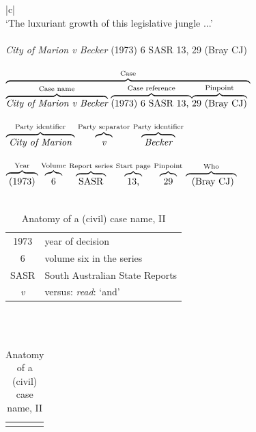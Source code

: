  \newpage

\begin{table}
\begin{center}
\begin{tabular}{|c|}
\hline \\
`The luxuriant growth of this legislative jungle ...'
\\ \\%
\textit{City of Marion v Becker} (1973) 6 SASR 13, 29 (Bray CJ)
\\ \\%
$%
\stackrel{\textrm{Case}}{%
\overbrace{%
\stackrel{\textrm{Case name}}{\overbrace{\textit{City of Marion v Becker}}}\ 
\stackrel{\textrm{Case reference}}{\overbrace{\textrm{(1973) 6 SASR 13, }}}
\stackrel{\textrm{Pinpoint}}{\overbrace{\textrm{29 (Bray CJ)}}}\
}}
$%
\\ \\%
$%
\stackrel{\textrm{Party identifier}}{\overbrace{\textit{\phantom{[}City of Marion\phantom{[}}}}\ 
\stackrel{\textrm{Party separator}}{\overbrace{\textit{\phantom{[}v\phantom{[}}}}\ 
\stackrel{\textrm{Party identifier}}{\overbrace{\textit{\phantom{[}Becker\phantom{[}}}}
$%
\\ \\%
$%
\stackrel{\textrm{Year}}{\overbrace{\textrm{\strut\phantom{[}(1973)\phantom{[}}}}\ 
\stackrel{\textrm{Volume}}{\overbrace{\textrm{\strut\phantom{[}6\phantom{[}}}}\ \stackrel{\textrm{Report series}}{\overbrace{\textrm{\phantom{[}SASR\phantom{[}}}}\ 
\stackrel{\textrm{Start page}}{\overbrace{\textrm{\phantom{[}13,\phantom{[}}}}\ 
\stackrel{\textrm{Pinpoint}}{\overbrace{\textrm{\phantom{[}29\phantom{[}}}}\ 
\stackrel{\textrm{Who}}{\overbrace{\textrm{\phantom{[}
(Bray CJ)\phantom{[}}}}\ 
$%
\\ \\%
\begin{tabular}{cl}
1973 & year of decision \\
6 & volume six in the series \\
SASR & South Australian State Reports \\
\textit{v} & versus: \textit{read}: `and'
\end{tabular}
\\\mg \\%
\hline
\end{tabular}
\begin{tabular}{l}
 \lcinline[\nopp 29 \mkbibparens{Bray CJ}]{becker}\\
\end{tabular}
\caption{Anatomy of a (civil) case name, II}
\label{tab:casename2}
\end{center}
\end{table}

